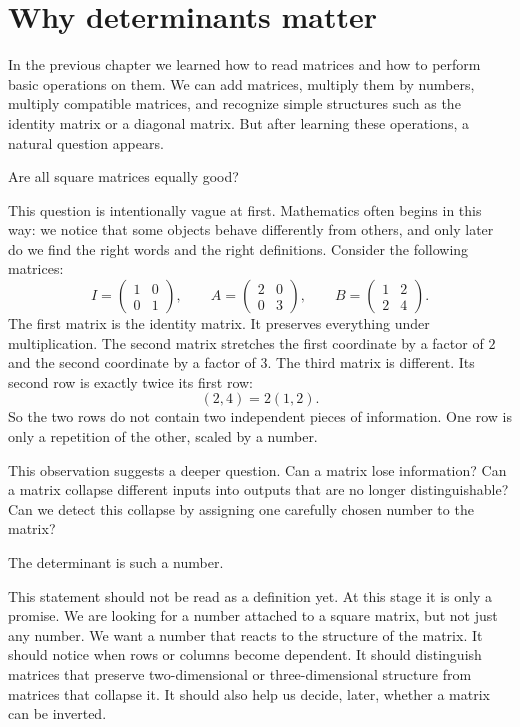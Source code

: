 \section{Why determinants matter}

In the previous chapter we learned how to read matrices and how to perform basic operations on them. We can add matrices, multiply them by numbers, multiply compatible matrices, and recognize simple structures such as the identity matrix or a diagonal matrix. But after learning these operations, a natural question appears.

Are all square matrices equally good?

This question is intentionally vague at first. Mathematics often begins in this way: we notice that some objects behave differently from others, and only later do we find the right words and the right definitions. Consider the following matrices:
\[
I=\begin{pmatrix}1&0\\0&1\end{pmatrix},
\qquad
A=\begin{pmatrix}2&0\\0&3\end{pmatrix},
\qquad
B=\begin{pmatrix}1&2\\2&4\end{pmatrix}.
\]
The first matrix is the identity matrix. It preserves everything under multiplication. The second matrix stretches the first coordinate by a factor of \(2\) and the second coordinate by a factor of \(3\). The third matrix is different. Its second row is exactly twice its first row:
\[
(2,4)=2(1,2).
\]
So the two rows do not contain two independent pieces of information. One row is only a repetition of the other, scaled by a number.

This observation suggests a deeper question. Can a matrix lose information? Can a matrix collapse different inputs into outputs that are no longer distinguishable? Can we detect this collapse by assigning one carefully chosen number to the matrix?

The determinant is such a number.

This statement should not be read as a definition yet. At this stage it is only a promise. We are looking for a number attached to a square matrix, but not just any number. We want a number that reacts to the structure of the matrix. It should notice when rows or columns become dependent. It should distinguish matrices that preserve two-dimensional or three-dimensional structure from matrices that collapse it. It should also help us decide, later, whether a matrix can be inverted.

